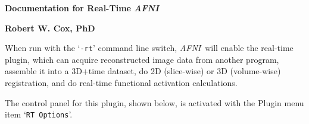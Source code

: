 
\newcommand{\afni}{{\it AFNI\,}}
\newcommand{\afnit}{{\it AFNI\/}\ }
\newcommand{\tothreed}{{\sf to3d\,}}
\newcommand{\tothreedit}{{\sf to3d\/}\ }
\newcommand{\MCW}{{\sf MCW}}

\setlength{\topmargin}{0.0in}
\setlength{\textheight}{9.02in}
\setlength{\textwidth}{6.5in}
\setlength{\oddsidemargin}{0.25in}
\setlength{\evensidemargin}{0.25in}
\setlength{\parskip}{0.9ex plus 0.1ex}
\setlength{\parindent}{0em}

\dashpage
\raggedbottom
\nofiles

\newcommand{\blob}{\hspace*{1em}}
\newcommand{\vex}{\vspace{1ex}}

\setlength{\fboxsep}{1.3pt}
\setlength{\fboxrule}{0.6pt}
\newcommand{\button}[1]{\fbox{\tt #1}}



\centerline{\Large\bf Documentation for Real-Time \afni}\vex
\centerline{\large\bf Robert W. Cox, PhD}\vex

When run with the `{\tt -rt}' command line switch, \afnit will enable the
real-time plugin, which can acquire reconstructed image data from
another program, assemble it into a 3D+time dataset, do 2D (slice-wise)
or 3D (volume-wise) registration, and do real-time functional
activation calculations.

The control panel for this plugin, shown below, is activated with the Plugin menu
item `{\tt RT~Options}'.\\[-2ex]
{\hspace*{1.1in}\epsfxsize=5.4in}


